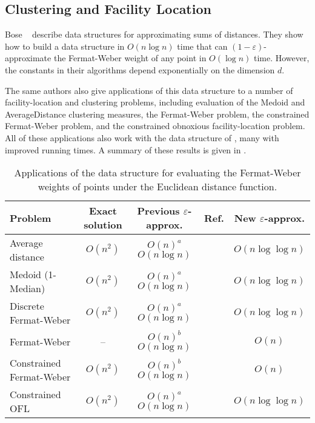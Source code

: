\documentclass[charterfonts,lotsofwhite]{patmorin}
\newcommand{\eps}{\varepsilon}
\begin{document}
\subsection{Clustering and Facility Location}

Bose \etal\ \cite{bmm02} describe data structures for approximating
sums of distances.  They show how to build a data structure in
$O(n\log n)$ time that can $(1-\eps)$-approximate the Fermat-Weber
weight of any point in $O(\log n)$ time.  However, the constants in
their algorithms depend exponentially on the dimension $d$.

The same authors also give applications of this data structure to a
number of facility-location and clustering problems, including
evaluation of the Medoid and AverageDistance clustering measures, the
Fermat-Weber problem, the constrained Fermat-Weber problem, and the
constrained obnoxious facility-location problem.  All of these
applications also work with the data structure of , many
with improved running times.  A summary of these results is given in
.


\begin{table}
\begin{minipage}{\textwidth}
\begin{center}\begin{tabular}{l|cccc}
Problem      & Exact solution & Previous $\eps$-approx. & Ref. & New $\eps$-approx. \\ \hline
Average distance  & $O(n^2)$ & $O(n)^a$ $O(n\log n)$ & 
    \cite{i99,bmm02} & $O(n\log\log n)$ \\
Medoid (1-Median) & $O(n^2)$ & $O(n)^a$ $O(n\log n)$ & 
    \cite{i99,bmm02} & $O(n\log\log n)$ \\
Discrete Fermat-Weber & $O(n^2)$ & $O(n)^a$ $O(n\log n)$ & 
    \cite{i99,bmm02} & $O(n\log\log n)$ \\
Fermat-Weber & -- & $O(n)^b$ $O(n\log n)$ & 
    \cite{i99,bmm02} & $O(n)$ \\
Constrained Fermat-Weber & $O(n^2)$ & $O(n)^b$ $O(n\log n)$ & 
    \cite{i99,bmm02} & $O(n)$ \\
Constrained OFL & $O(n^2)$ & $O(n)^a$ $O(n\log n)$ & 
    \cite{i99,k97,bmm02} & $O(n\log\log n)$ 
\end{tabular}\end{center}
\end{minipage}
\caption{Applications of the data structure for evaluating the Fermat-Weber
  weights of points under the Euclidean distance function.}
\end{table}
\end{document}
